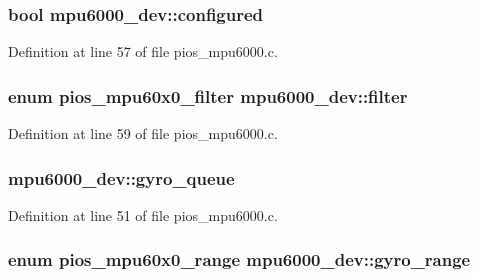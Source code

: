 \hypertarget{structmpu6000__dev_a235cf7e1cc85cf6707100027c483894a}{
\subsubsection[{configured}]{ {\bf bool} mpu6000\-\_\-dev\-::configured}}\label{structmpu6000__dev_a235cf7e1cc85cf6707100027c483894a}


Definition at line 57 of file pios\-\_\-mpu6000.\-c.

\hypertarget{structmpu6000__dev_ad8507301bf86feb8f18211ddb353f332}{
\subsubsection[{filter}]{\setlength{\rightskip}{0pt plus 5cm}enum {\bf pios\-\_\-mpu60x0\-\_\-filter} mpu6000\-\_\-dev\-::filter}}\label{structmpu6000__dev_ad8507301bf86feb8f18211ddb353f332}


Definition at line 59 of file pios\-\_\-mpu6000.\-c.

\hypertarget{structmpu6000__dev_a356a86d4ad42dd2daecb5e255cc5f7ce}{
\subsubsection[{gyro\-\_\-queue}]{ mpu6000\-\_\-dev\-::gyro\-\_\-queue}}\label{structmpu6000__dev_a356a86d4ad42dd2daecb5e255cc5f7ce}


Definition at line 51 of file pios\-\_\-mpu6000.\-c.

\hypertarget{structmpu6000__dev_a0d330b8cdca1d01d4b5eecd21bba78f6}{
\subsubsection[{gyro\-\_\-range}]{\setlength{\rightskip}{0pt plus 5cm}enum {\bf pios\-\_\-mpu60x0\-\_\-range} mpu6000\-\_\-dev\-::gyro\-\_\-range}}\label{structmpu6000__dev_a0d330b8cdca1d01d4b5eecd21bba78f6}



